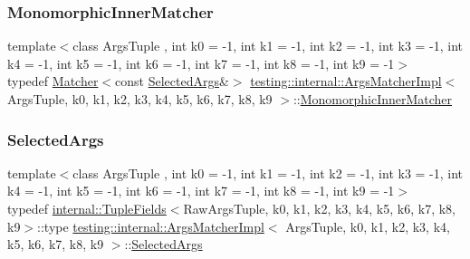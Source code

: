 \subsubsection{\texorpdfstring{MonomorphicInnerMatcher}{MonomorphicInnerMatcher}}
{\footnotesize\ttfamily template$<$class Args\+Tuple , int k0 = -\/1, int k1 = -\/1, int k2 = -\/1, int k3 = -\/1, int k4 = -\/1, int k5 = -\/1, int k6 = -\/1, int k7 = -\/1, int k8 = -\/1, int k9 = -\/1$>$ \\
typedef \mbox{\hyperlink{classtesting_1_1Matcher}{Matcher}}$<$const \mbox{\hyperlink{classtesting_1_1internal_1_1ArgsMatcherImpl_ab061679f6251e56ccbedaf0c316d00ff}{Selected\+Args}}\&$>$ \mbox{\hyperlink{classtesting_1_1internal_1_1ArgsMatcherImpl}{testing\+::internal\+::\+Args\+Matcher\+Impl}}$<$ Args\+Tuple, k0, k1, k2, k3, k4, k5, k6, k7, k8, k9 $>$\+::\mbox{\hyperlink{classtesting_1_1internal_1_1ArgsMatcherImpl_ab90d2c074b2072d6c39bf26209fb941f}{Monomorphic\+Inner\+Matcher}}}

\mbox{\label{classtesting_1_1internal_1_1ArgsMatcherImpl_ab061679f6251e56ccbedaf0c316d00ff}} 
\subsubsection{\texorpdfstring{SelectedArgs}{SelectedArgs}}
{\footnotesize\ttfamily template$<$class Args\+Tuple , int k0 = -\/1, int k1 = -\/1, int k2 = -\/1, int k3 = -\/1, int k4 = -\/1, int k5 = -\/1, int k6 = -\/1, int k7 = -\/1, int k8 = -\/1, int k9 = -\/1$>$ \\
typedef \mbox{\hyperlink{classtesting_1_1internal_1_1TupleFields}{internal\+::\+Tuple\+Fields}}$<$Raw\+Args\+Tuple, k0, k1, k2, k3, k4, k5, k6, k7, k8, k9$>$\+::type \mbox{\hyperlink{classtesting_1_1internal_1_1ArgsMatcherImpl}{testing\+::internal\+::\+Args\+Matcher\+Impl}}$<$ Args\+Tuple, k0, k1, k2, k3, k4, k5, k6, k7, k8, k9 $>$\+::\mbox{\hyperlink{classtesting_1_1internal_1_1ArgsMatcherImpl_ab061679f6251e56ccbedaf0c316d00ff}{Selected\+Args}}}



